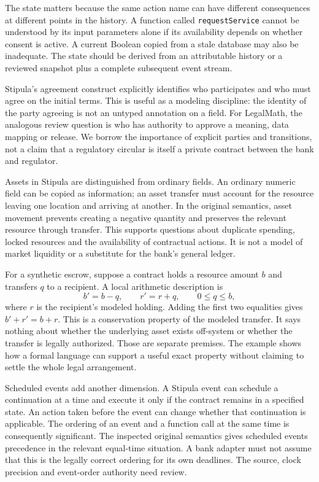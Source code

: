 \documentclass[12pt,a4paper,oneside,openany]{book}
\begin{document}
The state matters because the same action name can have different consequences
at different points in the history. A function called \texttt{requestService}
cannot be understood by its input parameters alone if its availability depends
on whether consent is active. A current Boolean copied from a stale database
may also be inadequate. The state should be derived from an attributable
history or a reviewed snapshot plus a complete subsequent event stream.

Stipula's agreement construct explicitly identifies who participates and who
must agree on the initial terms. This is useful as a modeling discipline:
the identity of the party agreeing is not an untyped annotation on a field.
For LegalMath, the analogous review question is who has authority to approve a
meaning, data mapping or release. We borrow the importance of explicit parties
and transitions, not a claim that a regulatory circular is itself a private
contract between the bank and regulator.

Assets in Stipula are distinguished from ordinary fields. An ordinary numeric
field can be copied as information; an asset transfer must account for the
resource leaving one location and arriving at another. In the original
semantics, asset movement prevents creating a negative quantity and preserves
the relevant resource through transfer. This supports questions about duplicate
spending, locked resources and the availability of contractual actions. It is
not a model of market liquidity or a substitute for the bank's general ledger.

For a synthetic escrow, suppose a contract holds a resource amount $b$ and
transfers $q$ to a recipient. A local arithmetic description is
\begin{equation}
 b'=b-q,\qquad r'=r+q,\qquad 0\leq q\leq b,
 \label{eq:asset-transfer}
\end{equation}
where $r$ is the recipient's modeled holding. Adding the first two equalities
gives $b'+r'=b+r$. This is a conservation property of the modeled transfer.
It says nothing about whether the underlying asset exists off-system or whether
the transfer is legally authorized. Those are separate premises. The example
shows how a formal language can support a useful exact property without
claiming to settle the whole legal arrangement.

Scheduled events add another dimension. A Stipula event can schedule a
continuation at a time and execute it only if the contract remains in a
specified state. An action taken before the event can change whether that
continuation is applicable. The ordering of an event and a function call at
the same time is consequently significant. The inspected original semantics
gives scheduled events precedence in the relevant equal-time situation. A bank
adapter must not assume that this is the legally correct ordering for its own
deadlines. The source, clock precision and event-order authority need review.
\end{document}
